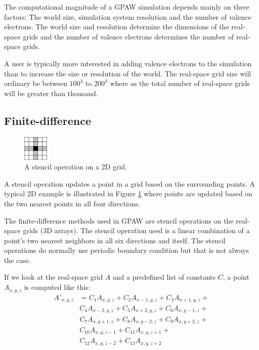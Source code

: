 \documentclass[conference]{IEEEtran}
\begin{document}
The computational magnitude of a GPAW simulation depends mainly on three factors: The world size, simulation system resolution and the number of valence electrons. The world size and resolution determine the dimensions of the real-space grids and the number of valence electrons determines the number of real-space grids.

A user is typically more interested in adding valence electrons to the simulation than to increase the size or resolution of the world. The real-space grid size will ordinary be between $100^3$ to $200^3$ where as the total number of real-space grids will be greater than thousand.

\subsection{Finite-difference}
\begin{figure}
 \centering
 \includegraphics[width=45px]{gfx/stencil}
 \caption{A stencil operation on a 2D grid.}
 \label{fig:stencil}
\end{figure}
A stencil operation updates a point in a grid based on the surrounding points. A typical 2D example is illustrated in Figure \ref{fig:stencil} where points are updated based on the two nearest points in all four directions.

The finite-difference methods used in GPAW are stencil operations on the real-space grids (3D arrays). The stencil operation used is a linear combination of a point's two nearest neighbors in all six directions and itself. 
The stencil operations do normally use periodic boundary condition but that is not always the case.

If we look at the real-space grid $A$ and a predefined list of constants $C$, a point $A_{x,y,z}$ is computed like this:
\begin{displaymath}
\begin{array}{ll}
A'_{x,y,z} &= C_1 A_{x,y,z} + C_2 A_{x-1,y,z} + C_3 A_{x+1,y,z} +\\
           &  C_4 A_{x-2,y,z} + C_5 A_{x+2,y,z} + C_6 A_{x,y-1,z} +\\
           &  C_7 A_{x,y+1,z} + C_8 A_{x,y-2,z} + C_9 A_{x,y+2,z} +\\
           &  C_{10} A_{x,y,z-1} + C_{11} A_{x,y,z+1} +\\
           &  C_{12} A_{x,y,z-2} + C_{13} A_{x,y,z+2}\\
\end{array}
\end{displaymath}
\end{document}
